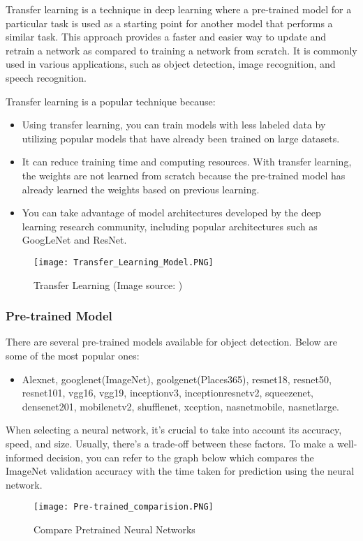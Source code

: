 Transfer learning is a technique in deep learning where a pre-trained model for a particular task is used as a starting point for another model that performs a similar task. This approach provides a faster and easier way to update and retrain a network as compared to training a network from scratch. It is commonly used in various applications, such as object detection, image recognition, and speech recognition. \cite{you2021logme}

Transfer learning is a popular technique because:
\begin{itemize}
    \item Using transfer learning, you can train models with less labeled data by utilizing popular models that have already been trained on large datasets.
    \item  It can reduce training time and computing resources. With transfer learning, the weights are not learned from scratch because the pre-trained model has already learned the weights based on previous learning.
    \item You can take advantage of model architectures developed by the deep learning research community, including popular architectures such as GoogLeNet and ResNet.
\end{itemize}
\begin{figure}[H]
     \centering\texttt{[image: Transfer\_Learning\_Model.PNG]}
    \caption{Transfer Learning (Image source: \cite{murugan2021diconet})}
    \label{fig: Transfer Learning}
\end{figure}
\subsubsection{Pre-trained Model}
There are several pre-trained models available for object detection. Below are some of the most popular ones:\\
\begin{itemize}
    \item Alexnet, googlenet(ImageNet), goolgenet(Places365), resnet18, resnet50, resnet101, vgg16, vgg19, inceptionv3, inceptionresnetv2, squeezenet, densenet201, mobilenetv2, shufflenet, xception, nasnetmobile, nasnetlarge. 
\end{itemize}

When selecting a neural network, it's crucial to take into account its accuracy, speed, and size. Usually, there's a trade-off between these factors. To make a well-informed decision, you can refer to the graph below which compares the ImageNet validation accuracy with the time taken for prediction using the neural network. \cite{li2019analysis}
\begin{figure}[H]
    \centering
    \texttt{[image: Pre-trained\_comparision.PNG]}
    \caption{Compare Pretrained Neural Networks \cite{YOLo_NAS_Whitepaper_2022}}
    \label{fig: Pretrained Model Comparison}
\end{figure}

